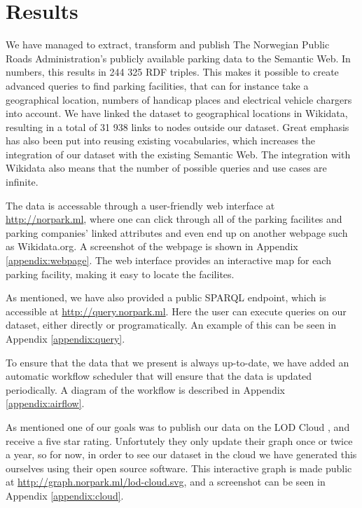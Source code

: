 \chapter{Results}
We have managed to extract, transform and publish The Norwegian Public Roads Administration's publicly available parking data to the Semantic Web. In numbers, this results in 244 325 RDF triples. This makes it possible to create advanced queries to find parking facilities, that can for instance take a geographical location, numbers of handicap places and electrical vehicle chargers into account. We have linked the dataset to geographical locations in Wikidata, resulting in a total of 31 938 links to nodes outside our dataset. Great emphasis has also been put into reusing existing vocabularies, which increases the integration of our dataset with the existing Semantic Web. The integration with Wikidata also means that the number of possible queries and use cases are infinite.

\vspace{5mm}
The data is accessable through a user-friendly web interface at \url{http://norpark.ml}, where one can click through all of the parking facilites and parking companies' linked attributes and even end up on another webpage such as Wikidata.org. A screenshot of the webpage is shown in Appendix \ref{appendix:webpage}. The web interface provides an interactive map for each parking facility, making it easy to locate the facilites.

\vspace{5mm}

As mentioned, we have also provided a public SPARQL endpoint, which is accessible at \url{http://query.norpark.ml}. Here the user can execute queries on our dataset, either directly or programatically. An example of this can be seen in Appendix \ref{appendix:query}.

\vspace{5mm}

To ensure that the data that we present is always up-to-date, we have added an automatic workflow scheduler that will ensure that the data is updated periodically. A diagram of the workflow is described in Appendix \ref{appendix:airflow}.

\vspace{5mm}

As mentioned one of our goals was to publish our data on the LOD Cloud \cite{lod-cloud}, and receive a five star rating. Unfortutely they only update their graph once or twice a year, so for now, in order to see our dataset in the cloud we have generated this ourselves using their open source software. This interactive graph is made public at \url{http://graph.norpark.ml/lod-cloud.svg}, and a screenshot can be seen in Appendix \ref{appendix:cloud}.

